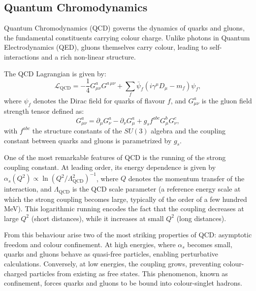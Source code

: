 \subsection{Quantum Chromodynamics}
\label{subsec:QCD}

Quantum Chromodynamics (QCD) governs the dynamics of quarks and gluons, the fundamental constituents carrying colour charge. Unlike photons in Quantum Electrodynamics (QED), gluons themselves carry colour, leading to self-interactions and a rich non-linear structure.

The QCD Lagrangian is given by:
\begin{equation}
\mathcal{L}_{\mathrm{QCD}} = -\frac{1}{4} G^{a}_{\mu\nu} G^{a\,\mu\nu} + \sum_{f} \bar{\psi}_f \left( i \gamma^\mu D_\mu - m_f \right) \psi_f,
\end{equation}
where \(\psi_f\) denotes the Dirac field for quarks of flavour \(f\), and \(G^a_{\mu\nu}\) is the gluon field strength tensor defined as:
\begin{equation}
G^a_{\mu\nu} = \partial_\mu G^a_\nu - \partial_\nu G^a_\mu + g_s f^{abc} G^b_\mu G^c_\nu,
\end{equation}
with \(f^{abc}\) the structure constants of the \(SU(3)\) algebra and the coupling constant between quarks and gluons is parametrized by \(g_s\).

One of the most remarkable features of QCD is the running of the strong coupling constant. At leading order, its energy dependence is given by $\alpha_s(Q^2) \propto \ln\!\left({Q^2}/{\Lambda_{\mathrm{QCD}}^2}\right)^{-1}$,
where \(Q\) denotes the momentum transfer of the interaction, and \(\Lambda_{\mathrm{QCD}}\) is the QCD scale parameter (a reference energy scale at which the strong coupling becomes large, typically of the order of a few hundred MeV). This logarithmic running encodes the fact that the coupling decreases at large \(Q^2\) (short distances), while it increases at small \(Q^2\) (long distances).  

From this behaviour arise two of the most striking properties of QCD: asymptotic freedom and colour confinement. At high energies, where \(\alpha_s\) becomes small, quarks and gluons behave as quasi-free particles, enabling perturbative calculations. Conversely, at low energies, the coupling grows, preventing colour-charged particles from existing as free states. This phenomenon, known as confinement, forces quarks and gluons to be bound into colour-singlet hadrons.

